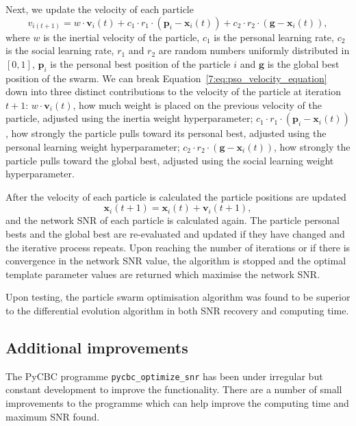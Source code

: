 Next, we update the velocity of each particle
%
\begin{equation}
    v_{i(t+1)} = w \cdot \mathbf{v}_i(t) + c_1 \cdot r_1 \cdot (\mathbf{p}_i - \mathbf{x}_i(t)) + c_2 \cdot r_2 \cdot (\mathbf{g} - \mathbf{x}_i(t)),
    \label{7:eq:pso_velocity_equation}
\end{equation}
%
where $w$ is the inertial velocity of the particle, $c_{1}$ is the personal learning rate, $c_{2}$ is the social learning rate, $r_{1}$ and $r_{2}$ are random numbers uniformly distributed in $\left[0, 1\right]$, $\textbf{p}_{i}$ is the personal best position of the particle $i$ and $\textbf{g}$ is the global best position of the swarm. We can break Equation~\ref{7:eq:pso_velocity_equation} down into three distinct contributions to the velocity of the particle at iteration $t + 1$: $w \cdot \textbf{v}_{i}(t)$, how much weight is placed on the previous velocity of the particle, adjusted using the inertia weight hyperparameter; $c_{1} \cdot r_{1} \cdot \left(\textbf{p}_{i} - \textbf{x}_{i}(t)\right)$, how strongly the particle pulls toward its personal best, adjusted using the personal learning weight hyperparameter; $c_{2} \cdot r_{2} \cdot \left(\textbf{g} - \textbf{x}_{i}(t)\right)$, how strongly the particle pulls toward the global best, adjusted using the social learning weight hyperparameter.

After the velocity of each particle is calculated the particle positions are updated
%
\begin{equation}
    \mathbf{x}_i(t+1) = \mathbf{x}_i(t) + \mathbf{v}_i(t+1),
\end{equation}
%
and the network SNR of each particle is calculated again. The particle personal bests and the global best are re-evaluated and updated if they have changed and the iterative process repeats. Upon reaching the number of iterations or if there is convergence in the network SNR value, the algorithm is stopped and the optimal template parameter values are returned which maximise the network SNR.

Upon testing, the particle swarm optimisation algorithm was found to be superior to the differential evolution algorithm in both SNR recovery and computing time.

\subsection{\label{7:sec:additional-improvements}Additional improvements}

The PyCBC programme \texttt{pycbc\_optimize\_snr} has been under irregular but constant development to improve the functionality. There are a number of small improvements to the programme which can help improve the computing time and maximum SNR found.

